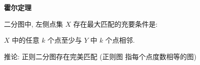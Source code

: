 \textbf{霍尔定理}

二分图中, 左侧点集 $X$ 存在最大匹配的充要条件是:

$X$ 中的任意 $k$ 个点至少与 $Y$ 中 $k$ 个点相邻.

推论: 正则二分图存在完美匹配 (正则图 指每个点度数相等的图)